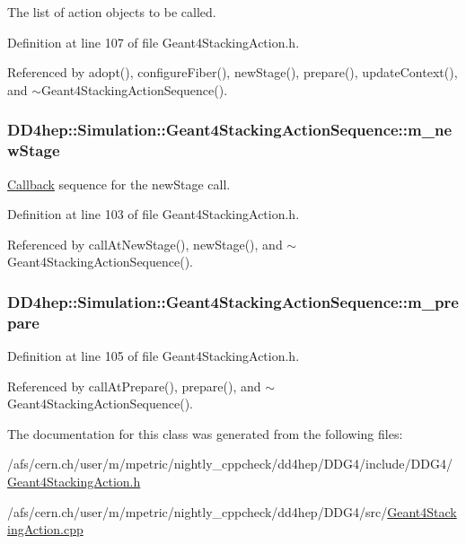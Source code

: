 The list of action objects to be called. 

Definition at line 107 of file Geant4StackingAction.h.

Referenced by adopt(), configureFiber(), newStage(), prepare(), updateContext(), and $\sim$Geant4StackingActionSequence().\hypertarget{class_d_d4hep_1_1_simulation_1_1_geant4_stacking_action_sequence_a9a67c9ae5d00befcdfaa81dfcac6dfb1}{
\subsubsection[{m\_\-newStage}]{ {\bf DD4hep::Simulation::Geant4StackingActionSequence::m\_\-newStage}}}
\label{class_d_d4hep_1_1_simulation_1_1_geant4_stacking_action_sequence_a9a67c9ae5d00befcdfaa81dfcac6dfb1}


\hyperlink{class_d_d4hep_1_1_callback}{Callback} sequence for the newStage call. 

Definition at line 103 of file Geant4StackingAction.h.

Referenced by callAtNewStage(), newStage(), and $\sim$Geant4StackingActionSequence().\hypertarget{class_d_d4hep_1_1_simulation_1_1_geant4_stacking_action_sequence_a5e1405fee094690bb84d74c38b619bbc}{
\subsubsection[{m\_\-prepare}]{ {\bf DD4hep::Simulation::Geant4StackingActionSequence::m\_\-prepare}}}
\label{class_d_d4hep_1_1_simulation_1_1_geant4_stacking_action_sequence_a5e1405fee094690bb84d74c38b619bbc}


Definition at line 105 of file Geant4StackingAction.h.

Referenced by callAtPrepare(), prepare(), and $\sim$Geant4StackingActionSequence().

The documentation for this class was generated from the following files:\begin{DoxyCompactItemize}
\item 
/afs/cern.ch/user/m/mpetric/nightly\_\-cppcheck/dd4hep/DDG4/include/DDG4/\hyperlink{_geant4_stacking_action_8h}{Geant4StackingAction.h}\item 
/afs/cern.ch/user/m/mpetric/nightly\_\-cppcheck/dd4hep/DDG4/src/\hyperlink{_geant4_stacking_action_8cpp}{Geant4StackingAction.cpp}\end{DoxyCompactItemize}
